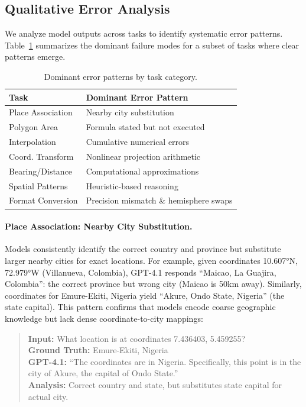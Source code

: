 \subsection{Qualitative Error Analysis}
\label{app:error_analysis}

We analyze model outputs across tasks to identify systematic error patterns. Table~\ref{tab:error_patterns} summarizes the dominant failure modes for a subset of tasks where clear patterns emerge.

\begin{table}[htbp]
\centering
\caption{Dominant error patterns by task category.}
\label{tab:error_patterns}
\small
\begin{tabular}{p{2.8cm}p{4.7cm}}
\toprule
\textbf{Task} & \textbf{Dominant Error Pattern} \\
\midrule
Place Association & Nearby city substitution \\
Polygon Area & Formula stated but not executed \\
Interpolation & Cumulative numerical errors \\
Coord. Transform & Nonlinear projection arithmetic \\
Bearing/Distance & Computational approximations \\
Spatial Patterns & Heuristic-based reasoning \\
Format Conversion & Precision mismatch \& hemisphere swaps \\
\bottomrule
\end{tabular}
\end{table}

\paragraph{Place Association: Nearby City Substitution.}
Models consistently identify the correct country and province but substitute larger nearby cities for exact locations. For example, given coordinates 10.607°N, 72.979°W (Villanueva, Colombia), GPT-4.1 responds ``Maicao, La Guajira, Colombia'': the correct province but wrong city (Maicao is 50km away). Similarly, coordinates for Emure-Ekiti, Nigeria yield ``Akure, Ondo State, Nigeria'' (the state capital). This pattern confirms that models encode coarse geographic knowledge but lack dense coordinate-to-city mappings:

\begin{quote}
\small
\textbf{Input:} What location is at coordinates 7.436403, 5.459255?\\
\textbf{Ground Truth:} Emure-Ekiti, Nigeria\\
\textbf{GPT-4.1:} ``The coordinates are in Nigeria. Specifically, this point is in the city of Akure, the capital of Ondo State.''\\
\textbf{Analysis:} Correct country and state, but substitutes state capital for actual city.
\end{quote}

